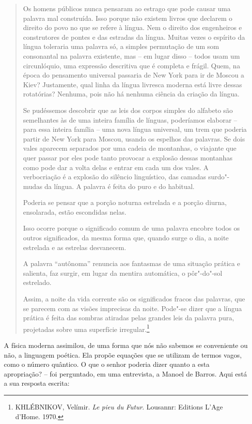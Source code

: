\begin{quote}
Os homens públicos nunca pensaram ao estrago que pode causar uma palavra
mal construída. Isso porque não existem livros que declarem o direito do
povo no que se refere à língua. Nem o direito dos engenheiros e
construtores de pontes e das estradas da língua. Muitas vezes o espírito
da língua toleraria uma palavra só, a simples permutação de um som
consonantal na palavra existente, mas -- em lugar disso -- todos usam um
circunlóquio, uma expressão descritiva que é completa e frágil. Quem, na
época do pensamento universal passaria de New York para ir de Moscou a
Kiev? Justamente, qual linha da língua livresca moderna está livre
dessas rotatórias? Nenhuma, pois não há nenhuma ciência da criação da
língua.

Se pudéssemos descobrir que as leis dos corpos simples do alfabeto são
semelhantes às de uma inteira família de línguas, poderíamos elaborar --
para essa inteira família -- uma nova língua universal, um trem que
poderia partir de New York para Moscou, usando os espelhos das palavras.
Se dois vales aparecem separados por uma cadeia de montanhas, o viajante
que quer passar por eles pode tanto provocar a explosão dessas montanhas
como pode dar a volta delas e entrar em cada um dos vales. A
verbocriação é a explosão do silêncio linguístico, das camadas
surdo"-mudas da língua. A palavra é feita do puro e do habitual.

Poderia se pensar que a porção noturna estrelada e a porção diurna,
ensolarada, estão escondidas nelas.

Isso ocorre porque o significado comum de uma palavra encobre todos os
outros significados, da mesma forma que, quando surge o dia, a noite
estrelada e as estrelas desvanecem.

A palavra ``autônoma'' renuncia aos fantasmas de uma situação prática e
salienta, faz surgir, em lugar da mentira automática, o pôr"-do"-sol
estrelado.

Assim, a noite da vida corrente são os significados fracos das palavras,
que se parecem com as visões imprecisas da noite. Pode"-se dizer que a
língua prática é feita das sombras atiradas pelas grandes leis da
palavra pura, projetadas sobre uma superfície irregular.\footnote{KHLÉBNIKOV,
  Velímir. \emph{Le pieu du Futur}. Lousannr: Editions L'Age d'Home.
  1970.}
\end{quote}

A física moderna assimilou, de uma forma que nós não sabemos se
conveniente ou não, a linguagem poética. Ela propõe equações que se
utilizam de termos vagos, como o número quântico. O que o senhor poderia
dizer quanto a esta apropriação? -- foi perguntado, em uma entrevista, a
Manoel de Barros. Aqui está a sua resposta escrita:

